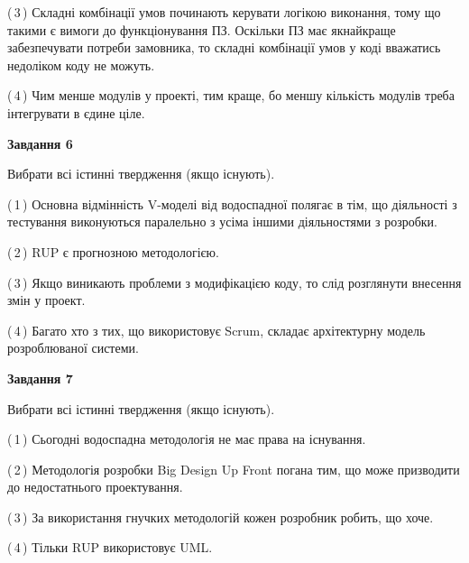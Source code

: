 \documentclass[10pt, ukrainian]{article}
\begin{document}
{\begin {large}
(\,3\,) Складні комбінації умов починають керувати логікою виконання, тому що такими є вимоги до функціонування ПЗ. Оскільки ПЗ має якнайкраще забезпечувати потреби замовника, то складні комбінації умов у коді вважатись недоліком коду не можуть. %



(\,4\,) Чим менше модулів у проекті, тим краще, бо меншу кількість модулів треба інтегрувати в єдине ціле. %

\newpage

{\begin {center}\textbf{Завдання 6}\end {center}}\par
Вибрати всі істинні твердження (якщо існують).\par
\vspace{2mm}



(\,1\,) Основна відмінність V-моделі від водоспадної полягає в тім, що діяльності з тестування виконуються паралельно з усіма іншими діяльностями з розробки. %



(\,2\,) RUP є прогнозною методологією. %



(\,3\,) Якщо виникають проблеми з модифікацією коду, то слід розглянути внесення змін у проект. %



(\,4\,) Багато хто з тих, що використовує Scrum, складає архітектурну модель розроблюваної системи. %


{\begin {center}\textbf{Завдання 7}\end {center}}\par
Вибрати всі істинні твердження (якщо існують).\par
\vspace{2mm}



(\,1\,) Сьогодні водоспадна методологія не має права на існування. %



(\,2\,) Методологія розробки Big Design Up Front погана тим, що може призводити до недостатнього проектування.%



(\,3\,) За використання гнучких методологій кожен розробник робить, що хоче. %



(\,4\,) Тільки RUP використовує UML.%



\end{large}}
\end{document}
